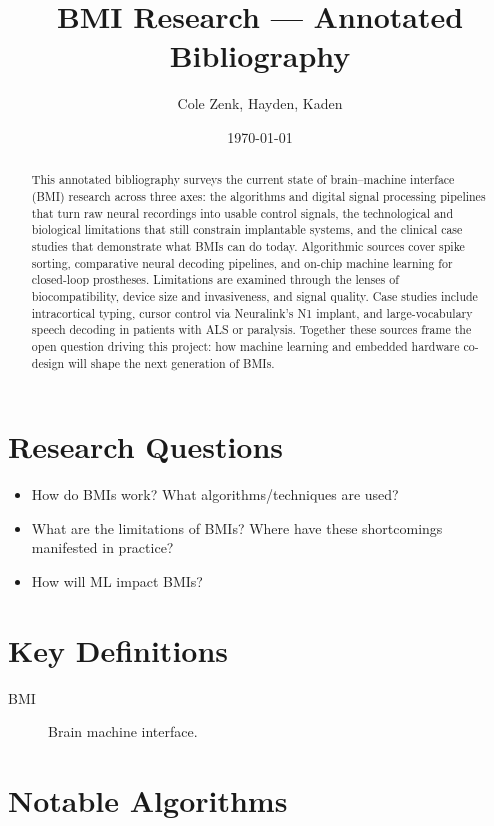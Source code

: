 \documentclass[11pt]{article}
\title{BMI Research --- Annotated Bibliography}
\author{Cole Zenk, Hayden, Kaden}
\date{\today}
\begin{document}
\maketitle

\begin{abstract}
This annotated bibliography surveys the current state of brain--machine
interface (BMI) research across three axes: the algorithms and digital
signal processing pipelines that turn raw neural recordings into usable
control signals, the technological and biological limitations that still
constrain implantable systems, and the clinical case studies that
demonstrate what BMIs can do today. Algorithmic sources cover spike
sorting, comparative neural decoding pipelines, and on-chip machine
learning for closed-loop prostheses. Limitations are examined through the
lenses of biocompatibility, device size and invasiveness, and signal
quality. Case studies include intracortical typing, cursor control via
Neuralink's N1 implant, and large-vocabulary speech decoding in patients
with ALS or paralysis. Together these sources frame the open question
driving this project: how machine learning and embedded hardware
co-design will shape the next generation of BMIs.
\end{abstract}

\section*{Research Questions}
\begin{itemize}
  \item How do BMIs work? What algorithms/techniques are used?
  \item What are the limitations of BMIs? Where have these shortcomings manifested in practice?
  \item How will ML impact BMIs?
\end{itemize}

\section*{Key Definitions}
\begin{description}
  \item[BMI] Brain machine interface.
\end{description}

\section{Notable Algorithms}
\end{document}
